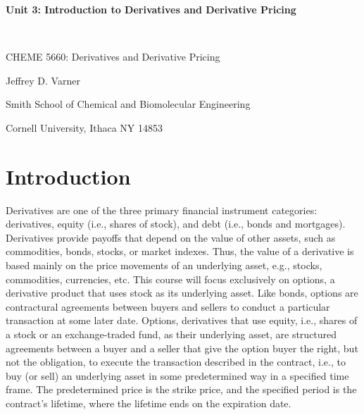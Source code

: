 \documentclass[11pt]{article}
\theoremstyle{definition}
\begin{document}
{\par\centering\textbf{\Large Unit 3: Introduction to Derivatives and Derivative Pricing}}\\
{\par \centering \large{CHEME 5660: Derivatives and Derivative Pricing}}
\vspace{0.2in}
{\par \centering \large{Jeffrey D. Varner}}
\vspace{0.05in}
{\par \centering \large{Smith School of Chemical and Biomolecular Engineering}}
{\par \centering \large{Cornell University, Ithaca NY 14853}}

\date{}
\thispagestyle{empty}

\setcounter{page}{1}

\tableofcontents
\clearpage
\listoffigures
\clearpage
\listofalgorithms
\clearpage

\section{Introduction}
Derivatives are one of the three primary financial instrument categories: derivatives, equity (i.e., shares of stock), and debt (i.e., bonds and mortgages). 
Derivatives provide payoffs that depend on the value of other assets, such as commodities, bonds, stocks, or market indexes. 
Thus, the value of a derivative is based mainly on the price movements of an underlying asset, e.g., stocks, commodities, currencies, etc. 
This course will focus exclusively on options, a derivative product that uses stock as its underlying asset. 
Like bonds, options are contractural agreements between buyers and sellers to conduct a particular transaction at some later date. 
Options, derivatives that use equity, i.e., shares of a stock or an exchange-traded fund, as their underlying asset, 
are structured agreements between a buyer and a seller that give the option buyer the right, but not the obligation, 
to execute the transaction described in the contract, i.e., to buy (or sell) an underlying asset in some predetermined way in a specified time frame. 
The predetermined price is the strike price, and the specified period is the contract's lifetime, where the lifetime ends on the expiration date. 
\end{document}
